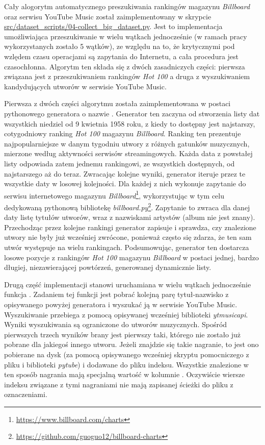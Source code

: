Cały alogorytm automatycznego preszukiwania rankingów magazynu \emph{Billboard} oraz serwisu YouTube Music został zaimplementowany w skrypcie \url{src/dataset_scripts/04-collect_big_dataset.py}. Jest to implementacja umożliwiająca przeszukiwanie w wielu wątkach jednocześnie (w ramach pracy wykorzystanych zostało 5 wątków), ze względu na to, że krytycznymi pod wzlędem czasu operacjami są zapytania do Internetu, a cała procedura jest czasochłonna. Algorytm ten składa się z dwóch zasadniczych części: pierwsza związana jest z przeszukiwaniem rankingów \emph{Hot 100} a druga z wyszukiwaniem kandydujących utworów w serwisie YouTube Music.

Pierwsza z dwóch części algorytmu została zaimplementowana w postaci pythonowego generatora o nazwie . Generator ten zaczyna od stworzenia listy dat wszystkich niedziel od 9 kwietnia 1958 roku, z kiedy to dostępny jest najstarszy, cotygodniowy ranking \emph{Hot 100} magazynu \emph{Billboard}. Ranking ten prezentuje najpopularniejsze w danym tygodniu utwory z różnych gatunków muzycznych, mierzone według aktywności serwisów streamingowych. Każda data z powstałej listy odpowiada zatem jednemu rankingowi, ze wszystkich dostępnych, od najstarszego aż do teraz. Zwracając kolejne wyniki, generator iteruje przez te wszystkie daty w losowej kolejności.  Dla każdej z nich wykonuje zapytanie do serwisu internetowego magazynu \emph{Billboard}\footnote{\url{https://www.billboard.com/charts}}, wykorzystując w tym celu dedykowaną pythonową bibliotekę \emph{billboard.py}\footnote{\url{https://github.com/guoguo12/billboard-charts}}.  Zapytanie to zwraca dla danej daty listę tytułów utworów, wraz z nazwiskami artystów (album nie jest znany). Przechodząc przez kolejne rankingi generator zapisuje i sprawdza, czy znalezione utwory nie były już wcześniej zwrócone, ponieważ często się zdarza, że ten sam utwór występuje na wielu rankingach. Podsumowując, generator ten dostarcza losowe pozycje z rankingów \emph{Hot 100} magazynu \emph{Billboard} w postaci jednej, bardzo długiej, niezawierającej powtórzeń, generowanej dynamicznie listy.

Drugą część implementacji stanowi uruchamiana w wielu wątkach jednocześnie funkcja . Zadaniem tej funkcji jest pobrać kolejną parę tytuł-nazwisko z opisywanego powyżej generatora i wyszukać ją w serwisie YouTube Music. Wyszukiwanie przebiega z pomocą opisywanej wcześniej biblioteki \emph{ytmusicapi}. Wyniki wyszukiwania są ograniczone do utworów muzycznych. Spośród pierwszych trzech wyników brany jest pierwszy taki, którego  nie zostało już pobrane dla jakiegoś innego utworu. Jeżeli znajdzie się takie nagranie, to jest ono pobierane na dysk (za pomocą opisywanego wcześniej skryptu pomocniczego z pliku i biblioteki \emph{pytube}) i dodawane do pliku indeksu. Wszystkie znalezione w ten sposób nagrania mają specjalną wartość  w kolumnie . Oczywiście wiersze indeksu związane z tymi nagraniami nie mają zapisanej ścieżki do pliku z oznaczeniami.


